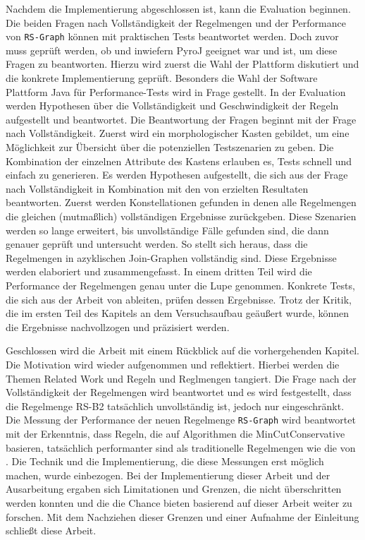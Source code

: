 Nachdem die Implementierung abgeschlossen ist, kann die Evaluation beginnen. Die beiden Fragen nach Vollständigkeit der Regelmengen und der Performance von \texttt{RS-Graph} können mit praktischen Tests beantwortet werden. Doch zuvor muss geprüft werden, ob und inwiefern PyroJ geeignet war und ist, um diese Fragen zu beantworten. Hierzu wird zuerst die Wahl  der Plattform diskutiert und die konkrete Implementierung geprüft. Besonders die Wahl der Software Plattform Java für Performance-Tests wird in Frage gestellt. In der Evaluation werden Hypothesen über die Vollständigkeit und Geschwindigkeit der Regeln aufgestellt und beantwortet. Die Beantwortung der Fragen beginnt mit der Frage nach Vollständigkeit. Zuerst wird ein morphologischer Kasten gebildet, um eine Möglichkeit zur Übersicht über die potenziellen Testszenarien zu geben. Die Kombination der einzelnen Attribute des Kastens erlauben es, Tests schnell und einfach zu generieren. Es werden Hypothesen aufgestellt, die sich aus der Frage nach Vollständigkeit in Kombination mit den von \cite{shanbhag2014optimizing} erzielten Resultaten  beantworten. Zuerst werden Konstellationen gefunden in denen alle Regelmengen die gleichen (mutmaßlich) vollständigen Ergebnisse zurückgeben. Diese Szenarien werden so lange erweitert, bis unvollständige Fälle gefunden sind, die dann genauer geprüft und untersucht werden. So stellt sich heraus, dass die Regelmengen in azyklischen Join-Graphen vollständig sind. Diese Ergebnisse werden elaboriert und zusammengefasst. In einem dritten Teil wird die Performance der Regelmengen genau unter die Lupe genommen. Konkrete Tests, die sich aus der Arbeit von \cite{shanbhag2014optimizing} ableiten, prüfen dessen Ergebnisse. Trotz der Kritik, die im ersten Teil des Kapitels an dem Versuchsaufbau geäußert wurde, können die Ergebnisse nachvollzogen und präzisiert werden.

Geschlossen wird die Arbeit mit einem Rückblick auf die vorhergehenden Kapitel. Die Motivation wird wieder aufgenommen und reflektiert. Hierbei werden die Themen Related Work und Regeln und Reglmengen tangiert. Die Frage nach der Vollständigkeit der Regelmengen wird beantwortet und es wird festgestellt, dass die Regelmenge RS-B2 tatsächlich unvollständig ist, jedoch nur eingeschränkt. Die Messung der Performance der neuen Regelmenge \texttt{RS-Graph} wird beantwortet mit der Erkenntnis, dass Regeln, die auf Algorithmen die MinCutConservative basieren, tatsächlich performanter sind als traditionelle Regelmengen wie die von \cite{pellenkoft1997complexity}. Die Technik und die Implementierung, die diese Messungen erst möglich machen, wurde einbezogen. Bei der Implementierung dieser Arbeit und der Ausarbeitung ergaben sich Limitationen und Grenzen, die nicht überschritten werden konnten und die die Chance bieten basierend auf dieser Arbeit weiter zu forschen. Mit dem Nachziehen dieser Grenzen und einer Aufnahme der Einleitung schließt diese Arbeit.